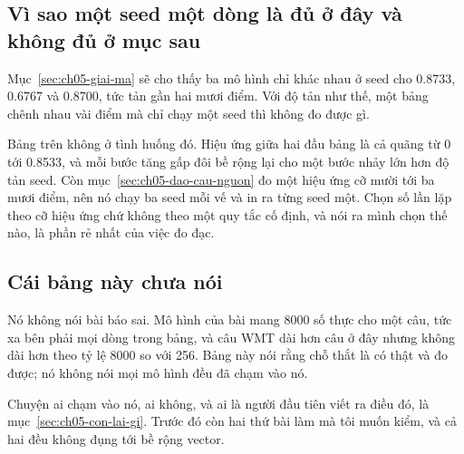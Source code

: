 \subsection*{Vì sao một seed một dòng là đủ ở đây và không đủ ở mục sau}

%
Mục~\ref{sec:ch05-giai-ma} sẽ cho thấy ba mô hình chỉ khác nhau ở seed cho
0.8733, 0.6767 và 0.8700, tức tản gần hai mươi điểm. Với độ tản như thế, một
bảng chênh nhau vài điểm mà chỉ chạy một seed thì không đo được gì.

Bảng trên không ở tình huống đó. Hiệu ứng giữa hai đầu bảng là cả quãng từ 0 tới
0.8533, và mỗi bước tăng gấp đôi bề rộng lại cho một bước nhảy lớn hơn độ tản
seed. Còn mục~\ref{sec:ch05-dao-cau-nguon} đo một hiệu ứng cỡ mười tới ba mươi
điểm, nên nó chạy ba seed mỗi vế và in ra từng seed một. Chọn số lần lặp theo cỡ
hiệu ứng chứ không theo một quy tắc cố định, và nói ra mình chọn thế nào, là
phần rẻ nhất của việc đo đạc.

\subsection*{Cái bảng này chưa nói}

Nó không nói bài báo sai. Mô hình của bài mang 8000 số thực cho một câu, tức xa
bên phải mọi dòng trong bảng, và câu WMT dài hơn câu ở đây nhưng không dài hơn
theo tỷ lệ 8000 so với 256. Bảng này nói rằng chỗ thắt là có thật và đo được;
nó không nói mọi mô hình đều đã chạm vào nó.

Chuyện ai chạm vào nó, ai không, và ai là người đầu tiên viết ra điều đó, là
mục~\ref{sec:ch05-con-lai-gi}. Trước đó còn hai thứ bài làm mà tôi muốn kiểm,
và cả hai đều không đụng tới bề rộng vector.
